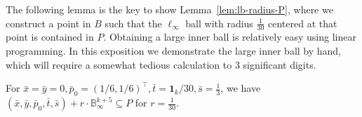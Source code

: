 \documentclass{theoretics}
\begin{document}
The following lemma is the key to show Lemma~\ref{lem:lb-radius-P}, where we construct a point in $B$ such that the $\ell_\infty$ ball with radius $\frac{1}{30}$ centered at that point is contained in $P$.
Obtaining a large inner ball is relatively easy using linear programming.
In this exposition we demonstrate the large inner ball by hand, which will require a somewhat tedious calculation to 3 significant digits.

\begin{lemma}\label{lem:innerball}
For $\bar x = \bar y = 0, \bar{p}_0 = (1/6,1/6)^\top, \bar t  = \mathbf{1}_{k}/30, \bar{s} = \frac{1}{3}$,
we have $(\bar x, \bar y, \bar{p}_0, \bar t, \bar{s}) + r\cdot \mathbb B_\infty^{k+5} \subseteq P$ for $r = \frac{1}{30}$.
\end{lemma}
\end{document}
